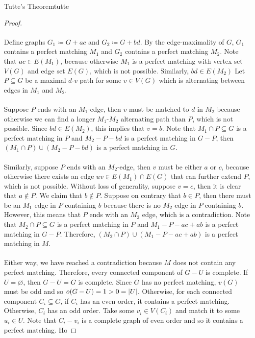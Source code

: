 \documentclass[math, code]{amznotes}
\theoremstyle{remark}
\begin{document}
\begin{thmbox}{Tutte's Theorem}{tutte}
\begin{proof}
        \\\\
        Define graphs $G_1 \coloneqq G + ac$ and $G_2 \coloneqq G + bd$. By the edge-maximality of $G$, $G_1$ contains a perfect matching $M_1$ and $G_2$ contains a perfect matching $M_2$. Note that $ac \in E(M_1)$, because otherwise $M_1$ is a perfect matching with vertex set $V(G)$ and edge set $E(G)$, which is not possible. Similarly, $bd \in E(M_2)$ Let $P \subseteq G$ be a maximal $d$-$v$ path for some $v \in V(G)$ which is alternating between edges in $M_1$ and $M_2$.
        \\\\
        Suppose $P$ ends with an $M_1$-edge, then $v$ must be matched to $d$ in $M_2$ because otherwise we can find a longer $M_1$-$M_2$ alternating path than $P$, which is not possible. Since $bd \in E(M_2)$, this implies that $v = b$. Note that $M_1 \cap P \subseteq G$ is a perfect matching in $P$ and $M_2 - P - bd$ is a perfect matching in $G - P$, then $(M_1 \cap P) \cup (M_2 - P - bd)$ is a perfect matching in $G$.
        \\\\
        Similarly, suppose $P$ ends with an $M_2$-edge, then $v$ must be either $a$ or $c$, because otherwise there exists an edge $uv \in E(M_1) \cap E(G)$ that can further extend $P$, which is not possible. Without loss of generality, suppose $v = c$, then it is clear that $a \notin P$. We claim that $b \notin P$. Suppose on contrary that $b \in P$, then there must be an $M_1$ edge in $P$ containing $b$ because there is no $M_2$ edge in $P$ containing $b$. However, this means that $P$ ends with an $M_2$ edge, which is a contradiction. Note that $M_2 \cap P \subseteq G$ is a perfect matching in $P$ and $M_1 - P - ac + ab$ is a perfect matching in $G - P$. Therefore, $(M_2 \cap P) \cup (M_1 - P - ac + ab)$ is a perfect matching in $M$.
        \\\\
        Either way, we have reached a contradiction because $M$ does not contain any perfect matching. Therefore, every connected component of $G - U$ is complete. If $U = \varnothing$, then $G - U = G$ is complete. Since $G$ has no perfect matching, $v(G)$ must be odd and so $o(G - U) = 1 > 0 = {\left\lvert {U} \right\rvert}$. Otherwise, for each connected component $C_i \subseteq G$, if $C_i$ has an even order, it contains a perfect matching. Otherwise, $C_i$ has an odd order. Take some $v_i \in V(C_i)$ and match it to some $u_i \in U$. Note that $C_i - v_i$ is a complete graph of even order and so it contains a perfect matching. Ho
    \end{proof}
\end{thmbox}
\end{document}
